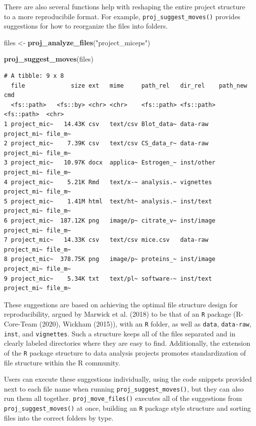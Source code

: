 \documentclass[12pt,twoside]{reedthesis}
\newenvironment{Shaded}{\begin{snugshade}}{\end{snugshade}}
\newcommand{\KeywordTok}[1]{\textcolor[rgb]{0.13,0.29,0.53}{\textbf{#1}}}
\newcommand{\StringTok}[1]{\textcolor[rgb]{0.31,0.60,0.02}{#1}}
\newcommand{\NormalTok}[1]{#1}
\begin{document}
There are also several functions help with reshaping the entire project
structure to a more reproducibile format. For example,
\texttt{proj\_suggest\_moves()} provides suggestions for how to
reorganize the files into folders.
\begin{Shaded}
\begin{Highlighting}[]
\NormalTok{files <-}\StringTok{ }\KeywordTok{proj_analyze_files}\NormalTok{(}\StringTok{"project_miceps"}\NormalTok{)}

\KeywordTok{proj_suggest_moves}\NormalTok{(files)}
\end{Highlighting}
\end{Shaded}
\begin{verbatim}
# A tibble: 9 x 8
  file             size ext   mime     path_rel   dir_rel    path_new    cmd    
  <fs::path>   <fs::by> <chr> <chr>    <fs::path> <fs::path> <fs::path>  <chr>  
1 project_mic~   14.43K csv   text/csv Blot_data~ data-raw   project_mi~ file_m~
2 project_mic~    7.39K csv   text/csv CS_data_r~ data-raw   project_mi~ file_m~
3 project_mic~   10.97K docx  applica~ Estrogen_~ inst/other project_mi~ file_m~
4 project_mic~    5.21K Rmd   text/x-~ analysis.~ vignettes  project_mi~ file_m~
5 project_mic~    1.41M html  text/ht~ analysis.~ inst/text  project_mi~ file_m~
6 project_mic~  187.12K png   image/p~ citrate_v~ inst/image project_mi~ file_m~
7 project_mic~   14.33K csv   text/csv mice.csv   data-raw   project_mi~ file_m~
8 project_mic~  378.75K png   image/p~ proteins_~ inst/image project_mi~ file_m~
9 project_mic~    5.34K txt   text/pl~ software-~ inst/text  project_mi~ file_m~
\end{verbatim}
These suggestions are based on achieving the optimal file structure
design for reproducibility, argued by Marwick et al. (2018) to be that
of an \texttt{R} package (R-Core-Team (2020), Wickham (2015)), with an
\texttt{R} folder, as well as \texttt{data}, \texttt{data-raw},
\texttt{inst}, and \texttt{vignettes}. Such a structure keeps all of the
files separated and in clearly labeled directories where they are easy
to find. Additionally, the extension of the \texttt{R} package structure
to data analysis projects promotes standardization of file structure
within the R community.

Users can execute these suggestions individually, using the code
snippets provided next to each file name when running
\texttt{proj\_suggest\_moves()}, but they can also run them all
together. \texttt{proj\_move\_files()} executes all of the suggestions
from \texttt{proj\_suggest\_moves()} at once, building an \texttt{R}
package style structure and sorting files into the correct folders by
type.
\end{document}
